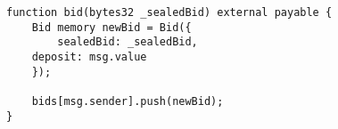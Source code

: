 \begin{lstlisting}[language=Solidity]
function bid(bytes32 _sealedBid) external payable {
	Bid memory newBid = Bid({
		sealedBid: _sealedBid,
	deposit: msg.value
	});
	
	bids[msg.sender].push(newBid);
}
\end{lstlisting}